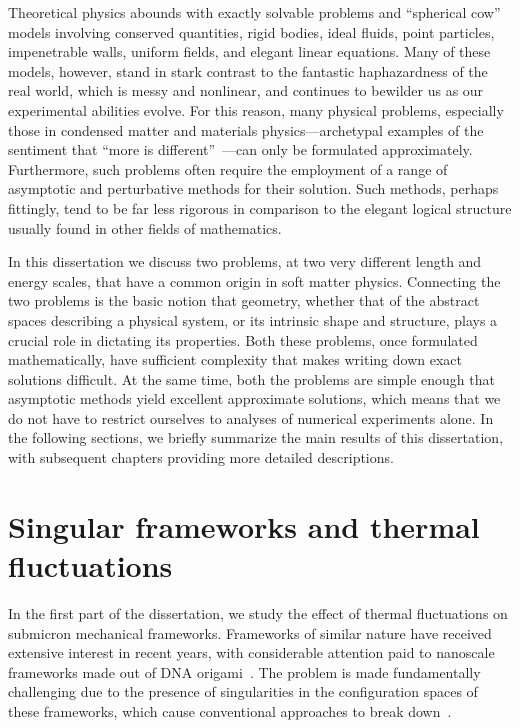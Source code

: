 Theoretical physics abounds with exactly solvable problems and ``spherical cow'' models involving conserved quantities, rigid bodies, ideal fluids, point particles, impenetrable walls, uniform fields, and elegant linear equations.
Many of these models, however, stand in stark contrast to the fantastic haphazardness of the real world, which is messy and nonlinear, and continues to bewilder us as our experimental abilities evolve.
For this reason, many physical problems, especially those in condensed matter and materials physics---archetypal examples of the sentiment that ``more is different''~\cite{anderson1972}---can only be formulated approximately.
Furthermore, such problems often require the employment of a range of asymptotic and perturbative methods for their solution.
Such methods, perhaps fittingly, tend to be far less rigorous in comparison to the elegant logical structure usually found in other fields of mathematics.

In this dissertation we discuss two problems, at two very different length and energy scales, that have a common origin in soft matter physics.
Connecting the two problems is the basic notion that geometry, whether that of the abstract spaces describing a physical system, or its intrinsic shape and structure, plays a crucial role in dictating its properties.
Both these problems, once formulated mathematically, have sufficient complexity that makes writing down exact solutions difficult.
At the same time, both the problems are simple enough that asymptotic methods yield excellent approximate solutions, which means that we do not have to restrict ourselves to analyses of numerical experiments alone.
In the following sections, we briefly summarize the main results of this dissertation, with subsequent chapters providing more detailed descriptions.

\section{Singular frameworks and thermal fluctuations}

In the first part of the dissertation, we study the effect of thermal fluctuations on submicron mechanical frameworks.
Frameworks of similar nature have received extensive interest in recent years, with considerable attention paid to nanoscale frameworks made out of DNA origami~\cite{dunn2015,matthies2016}.
The problem is made fundamentally challenging due to the presence of singularities in the configuration spaces of these frameworks, which cause conventional approaches to break down~\cite{mannattil2022}.


